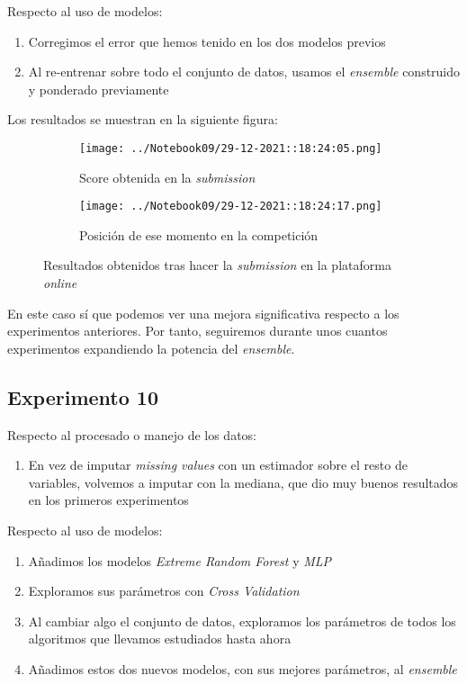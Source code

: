 \documentclass[11pt]{article}
\begin{document}
Respecto al uso de modelos:

\begin{enumerate}
    \item Corregimos el error que hemos tenido en los dos modelos previos
    \item Al re-entrenar sobre todo el conjunto de datos, usamos el \emph{ensemble} construido y ponderado previamente
\end{enumerate}

Los resultados se muestran en la siguiente figura:

\begin{figure}[H]
    \centering

    \begin{subfigure}[b]{0.45 \textwidth}
        \texttt{[image: ../Notebook09/29-12-2021::18:24:05.png]}
        \caption{Score obtenida en la \emph{submission}}
    \end{subfigure}
    \begin{subfigure}[b]{0.45 \textwidth}
        \texttt{[image: ../Notebook09/29-12-2021::18:24:17.png]}
        \caption{Posición de ese momento en la competición}
    \end{subfigure}

    \caption{Resultados obtenidos tras hacer la \emph{submission} en la plataforma \emph{online}}
\end{figure}

En este caso sí que podemos ver una mejora significativa respecto a los experimentos anteriores. Por tanto, seguiremos durante unos cuantos experimentos expandiendo la potencia del \emph{ensemble}.

\pagebreak

\subsection{Experimento 10}

Respecto al procesado o manejo de los datos:

\begin{enumerate}
    \item En vez de imputar \emph{missing values} con un estimador sobre el resto de variables, volvemos a imputar con la mediana, que dio muy buenos resultados en los primeros experimentos
\end{enumerate}

Respecto al uso de modelos:

\begin{enumerate}
    \item Añadimos los modelos \emph{Extreme Random Forest} y \emph{MLP}
    \item Exploramos sus parámetros con \emph{Cross Validation}
    \item Al cambiar algo el conjunto de datos, exploramos los parámetros de todos los algoritmos que llevamos estudiados hasta ahora
    \item Añadimos estos dos nuevos modelos, con sus mejores parámetros, al \emph{ensemble}
\end{enumerate}
\end{document}
